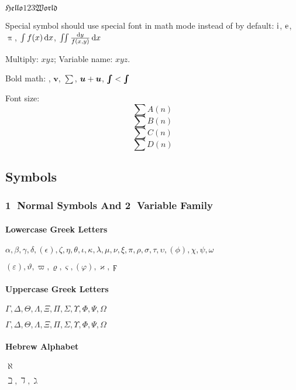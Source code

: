 $ \mathfrak{Hello123World} $    %

Special symbol should use special font in math mode instead of by default: 
$ \mathrm{i} $, $ \mathrm{e} $, $ \uppi $, $ \int f(x) \,\mathrm{d} x $, $ \iint \frac{\operatorname{d\!} y}{f(x, y)} \operatorname{d\!} x $     %

Multiply: $xyz$; Variable name: $ \mathit{xyz} $.

Bold math: 
{},                                 %
$ \boldsymbol{v} $, $ \pmb\sum $,                   %
$ \bm{u} + \hm{u} $, $ \bm{\int} < \hm{\int} $      %

Font size: 
\[\displaystyle
    \sum A(n)
\]
\[\textstyle
    \sum B(n)
\]
\[\scriptstyle
    \sum C(n)
\]
\[\scriptscriptstyle
    \sum D(n)
\]

\subsection{Symbols}
\subsubsection{\textcircled{1} Normal Symbols And \textcircled{2} Variable Family}
\paragraph{Lowercase Greek Letters}
{\LARGE
    $ \alpha, \beta, \gamma, \delta, (\epsilon), \zeta, \eta, \theta, \iota, \kappa, \lambda, \mu, 
    \nu, \xi, \pi, \rho, \sigma, \tau, \upsilon, (\phi), \chi, \psi, \omega $

    $ (\varepsilon), \vartheta, \varpi, \varrho, \varsigma, (\varphi), 
    \varkappa, \digamma $   %
}

\paragraph{Uppercase Greek Letters}
{\LARGE
    $ \Gamma, \Delta, \Theta, \Lambda, \Xi, \Pi, \Sigma, \Upsilon, \Phi, \Psi, \Omega $

    $ \varGamma, \varDelta, \varTheta, \varLambda, \varXi, \varPi, \varSigma, \varUpsilon, \varPhi, \varPsi, \varOmega $    %
}

\paragraph{Hebrew Alphabet}
{\LARGE
    $ \aleph $

    $ \beth, \daleth, \gimel $  %
}

